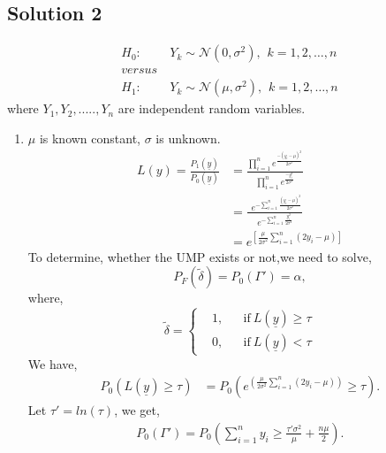 \documentclass[a4paper,english,12pt]{article}
\begin{document}
\hypertarget{solution2}{\subsection*{Solution 2}}
\begin{align*}
H_0:&~Y_k\sim \mathcal{N}(0,\sigma^2),\hspace{5pt}k=1,2,\dots,n\\
versus&\\
H_1:&~Y_k\sim \mathcal{N}(\mu,\sigma^2),\hspace{5pt}k=1,2,\dots,n
\end{align*}
where $Y_1,Y_2,.....,Y_n$ are independent random variables.
\begin{enumerate}[label=(\alph*).]
\item {$\mu$ is known constant, $\sigma$ is unknown.}
\begin{align*}
L(y)=\frac{P_1(\underline{y})}{P_0(\underline{y})}&=\frac{\prod\limits_{i=1}^{n} e^{\frac{-(y_i - \mu)^2}{2 \sigma^2}}}{ \prod\limits_{i=1}^{n} e^{\frac{-y_i^2}{2 \sigma^2}}}\\
&=\frac{\,\,\, e^{-\sum\limits_{i=1}^n \frac{(y_i - \mu)^2}{2 \sigma^2}}}{\, e^{-\sum\limits_{i=1}^n\frac{y_i^2}{2 \sigma^2}}}\\
&=e^{\left[\frac{\mu}{2 \sigma^2}\sum\limits_{i=1}^n(2y_i-\mu)\right]}
\end{align*}
To determine, whether the UMP exists or not,we need to solve,
\begin{equation}
P_F(\tilde{\delta})=P_0(\Gamma')=\alpha,
\end{equation}
where,
 \begin{equation}
\tilde{\delta}= \left \{
  \begin{aligned}
    &1, && \text{if}\ L(\underline{y})\geq\tau \\
    &0, && \text{if}\ L(\underline{y})<\tau 
  \end{aligned} \right.
\end{equation}
We have,
\begin{align*}
P_0(L(\underline{y})\geq\tau)&=P_0 (e^{\left( \frac{\mu}{2 \sigma^2}\sum\limits_{i=1}^n(2y_i-\mu)\right)} \geq \tau).
\end{align*}
Let $\tau' =ln(\tau)$, we get,
\begin{align*}
P_0(\Gamma')=P_0 \left(\sum\limits_{i=1}^n y_i\geq\frac{\tau' \sigma^2}{\mu}+\frac{n\mu}{2}\right).
\end{align*}

\end{enumerate}
\end{document}
